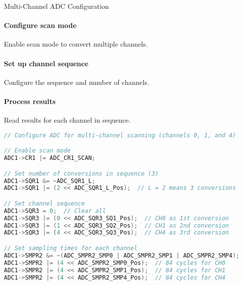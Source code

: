 \begin{KR}{Multi-Channel ADC Configuration}
\paragraph{Configure scan mode}
Enable scan mode to convert multiple channels.
\paragraph{Set up channel sequence}
Configure the sequence and number of channels.
\paragraph{Process results}
Read results for each channel in sequence.

\begin{lstlisting}[language=C, style=basesmol]
// Configure ADC for multi-channel scanning (channels 0, 1, and 4)

// Enable scan mode
ADC1->CR1 |= ADC_CR1_SCAN;

// Set number of conversions in sequence (3)
ADC1->SQR1 &= ~ADC_SQR1_L;
ADC1->SQR1 |= (2 << ADC_SQR1_L_Pos);  // L = 2 means 3 conversions

// Set channel sequence
ADC1->SQR3 = 0;  // Clear all
ADC1->SQR3 |= (0 << ADC_SQR3_SQ1_Pos);  // CH0 as 1st conversion
ADC1->SQR3 |= (1 << ADC_SQR3_SQ2_Pos);  // CH1 as 2nd conversion
ADC1->SQR3 |= (4 << ADC_SQR3_SQ3_Pos);  // CH4 as 3rd conversion

// Set sampling times for each channel
ADC1->SMPR2 &= ~(ADC_SMPR2_SMP0 | ADC_SMPR2_SMP1 | ADC_SMPR2_SMP4);
ADC1->SMPR2 |= (4 << ADC_SMPR2_SMP0_Pos);  // 84 cycles for CH0
ADC1->SMPR2 |= (4 << ADC_SMPR2_SMP1_Pos);  // 84 cycles for CH1
ADC1->SMPR2 |= (4 << ADC_SMPR2_SMP4_Pos);  // 84 cycles for CH4
\end{lstlisting}
\end{KR}



